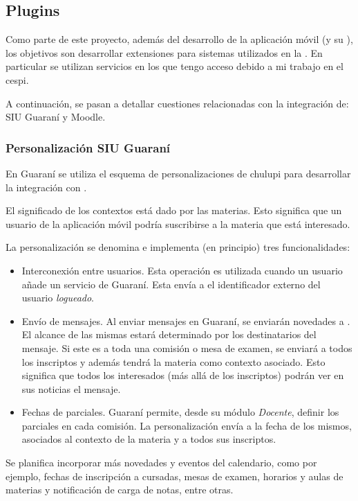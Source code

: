 \subsection{Plugins}
\label{desarrollo_plugins}

Como parte de este proyecto, además del desarrollo de la aplicación móvil (y su ), los objetivos son desarrollar extensiones para sistemas utilizados en la \unlp{}. En particular se utilizan servicios en los que tengo acceso debido a mi trabajo en el \gls{cespi}.

A continuación, se pasan a detallar cuestiones relacionadas con la integración de: SIU Guaraní y Moodle.

\subsubsection{Personalización SIU Guaraní}
\label{desarrollo_plugins_guarani}

En Guaraní se utiliza el esquema de personalizaciones de \gls{chulupi} para desarrollar la integración con \nombreApp{}. 

El significado de los contextos está dado por las materias. Esto significa que un usuario de la aplicación móvil podría suscribirse a la materia que está interesado.

La personalización se denomina  e implementa (en principio) tres funcionalidades:
\begin{itemize}
\item Interconexión entre usuarios. Esta operación es utilizada cuando un usuario añade un servicio de Guaraní. Esta envía a \nombreApp{} el identificador externo del usuario \textit{logueado}.
\item Envío de mensajes. Al enviar mensajes en Guaraní, se enviarán novedades a \nombreApp{}. El alcance de las mismas estará determinado por los destinatarios del mensaje. Si este es a toda una comisión o mesa de examen, se enviará a todos los inscriptos y además tendrá la materia como contexto asociado. Esto significa que todos los interesados (más allá de los inscriptos) podrán ver en sus noticias el mensaje.
\item Fechas de parciales. Guaraní permite, desde su módulo \textit{Docente}, definir los parciales en cada comisión. La personalización envía a \nombreApp{} la fecha de los mismos, asociados al contexto de la materia y a todos sus inscriptos. 
\end{itemize}

Se planifica incorporar más novedades y eventos del calendario, como por ejemplo, fechas de inscripción a cursadas, mesas de examen, horarios y aulas de materias y notificación de carga de notas, entre otras.

